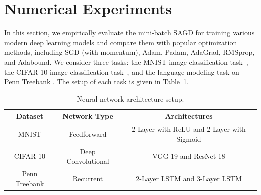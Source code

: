 \documentclass[11pt]{article}
\begin{document}
\section{Numerical Experiments} \label{sec: experiment}
\vspace{-0.05in}
In this section, we empirically evaluate the mini-batch \textsc{SAGD}
for training various modern deep
learning models and compare them with popular optimization methods, including SGD (with momentum), Adam, Padam,  AdaGrad,  RMSprop, and Adabound. 
We consider three tasks: the MNIST image classification task~\citep{lebo1998}, the CIFAR-10 image
classification task~\citep{krhi2009}, and the language modeling task on Penn Treebank
\citep{mama1993}. The setup of each task is given in Table~\ref{tab::network_setup}. 
\begin{table}[H]
	\centering
		\caption{Neural network architecture setup.}
	\label{tab::network_setup}
	\begin{tabular}{ccc}	
	\toprule[2pt]
	\textbf{Dataset} & \textbf{Network Type}    & \textbf{Architectures} \\ 	
	\toprule[1pt]
		MNIST            & Feedforward     & 2-Layer with ReLU  and 2-Layer with Sigmoid  \\
		CIFAR-10         & Deep Convolutional       & VGG-19 and ResNet-18                \\
		Penn Treebank    & Recurrent                & 2-Layer LSTM and 3-Layer LSTM      \\
		\toprule[1pt]
	\end{tabular}
\end{table}
\vspace{-0.15in}
\end{document}
